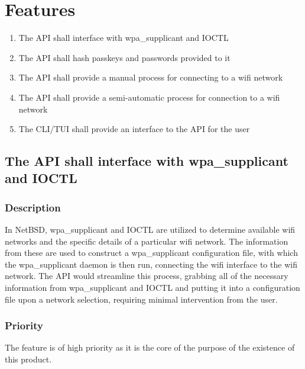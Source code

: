 \section{Features}

\begin{enumerate}
  \item The API shall interface with wpa\_supplicant and IOCTL
  \item The API shall hash passkeys and passwords provided to it
  \item The API shall provide a manual process for connecting to a wifi network
  \item The API shall provide a semi-automatic process for connection to a wifi network
  \item The CLI/TUI shall provide an interface to the API for the user
\end{enumerate}


\subsection{The API shall interface with wpa\_supplicant and IOCTL}
\subsubsection{Description}
In NetBSD, wpa\_supplicant and IOCTL are utilized to determine available wifi networks and
the specific details of a particular wifi network. The information from these are used to
construct a wpa\_supplicant configuration file, with which the wpa\_supplicant daemon is
then run, connecting the wifi interface to the wifi network. The API would streamline this
process, grabbing all of the necessary information from wpa\_supplicant and IOCTL
and putting it into a configuration file upon a network selection, requiring minimal
intervention from the user.

\subsubsection{Priority}
The feature is of high priority as it is the core of the purpose of the existence of this 
product.

